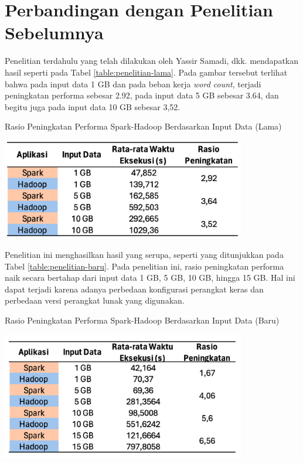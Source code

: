 \section{Perbandingan dengan Penelitian Sebelumnya \cite{samadiPerformanceComparisonHadoop2018}}
Penelitian terdahulu yang telah dilakukan oleh Yassir Samadi, dkk. mendapatkan hasil seperti pada Tabel \ref{table:penelitian-lama}. Pada gambar tersebut terlihat bahwa pada input data 1 GB dan pada beban kerja \textit{word count}, terjadi peningkatan performa sebesar 2.92, pada input data 5 GB sebesar 3.64, dan begitu juga pada input data 10 GB sebesar 3,52.


\begin{table}[h]
  \centering
  \caption{Rasio Peningkatan Performa Spark-Hadoop Berdasarkan Input Data (Lama) \cite{samadiPerformanceComparisonHadoop2018}}
  \includegraphics[width=0.8\textwidth]{figures/ch04/0-penelitian-lama-new}
  \label{table:penelitian-lama}
\end{table}

Penelitian ini menghasilkan hasil yang serupa, seperti yang ditunjukkan pada Tabel \ref{table:penelitian-baru}. Pada penelitian ini, rasio peningkatan performa naik secara bertahap dari input data 1 GB, 5 GB, 10 GB, hingga 15 GB. Hal ini dapat terjadi karena adanya perbedaan konfigurasi perangkat keras dan perbedaan versi perangkat lunak yang digunakan.

\begin{table}[h]
  \centering
  \caption{Rasio Peningkatan Performa Spark-Hadoop Berdasarkan Input Data (Baru)}
  \includegraphics[width=0.8\textwidth]{figures/ch04/0-penelitian-baru}
  \label{table:penelitian-baru}
\end{table}

